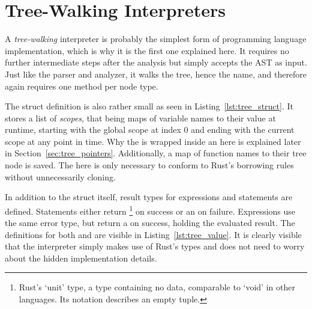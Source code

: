 \section{Tree-Walking Interpreters}
A \emph{tree-walking} interpreter is probably the simplest form of programming language implementation, which is why it is the first one explained here.
It requires no further intermediate steps after the analysis but simply accepts the AST as input.
Just like the parser and analyzer, it walks the tree, hence the name, and therefore again requires one method per node type.

The struct definition is also rather small as seen in Listing~\ref{lst:tree_struct}.
It stores a list of \emph{scopes}, that being maps of variable names to their value at runtime, starting with the global scope at index 0 and ending with the current scope at any point in time.
Why the  is wrapped inside an  here is explained later in Section~\ref{sec:tree_pointers}.
Additionally, a map of function names to their tree node is saved.
The  here is only necessary to conform to Rust's borrowing rules without unnecessarily cloning.


In addition to the struct itself, result types for expressions and statements are defined.
Statements either return \qVerb{()}\footnote{Rust's `unit' type, a type containing no data, comparable to `void' in other languages. Its notation describes an empty tuple.} on success or an  on failure.
Expressions use the same error type, but return a  on success, holding the evaluated result.
The definitions for both  and  are visible in Listing~\ref{lst:tree_value}.
It is clearly visible that the interpreter simply makes use of Rust's types and does not need to worry about the hidden implementation details.


